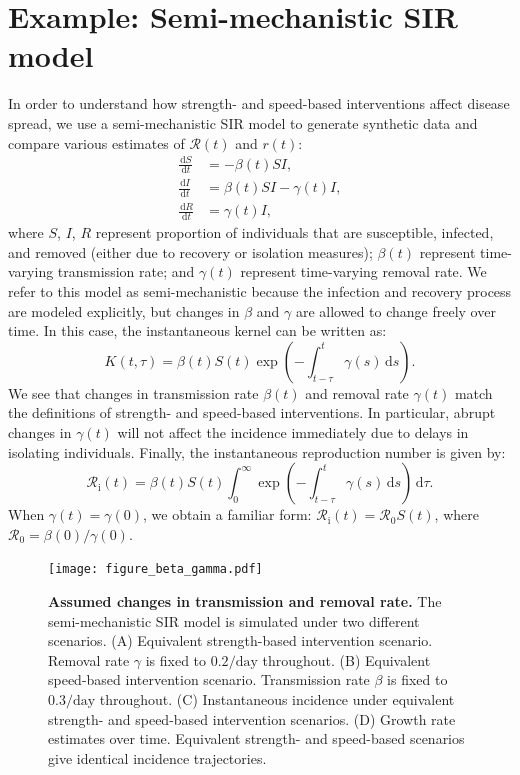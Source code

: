 \documentclass[12pt]{article}
\newcommand{\pday}{\ensuremath{/\textrm{day}}}
\newcommand{\Rx}[1]{\ensuremath{{\mathcal R}_{#1}}\xspace}
\newcommand{\Ro}{\Rx{0}}
\newcommand{\Ri}{\Rx{\mathrm{i}}}
\newcommand{\RR}{\ensuremath{{\mathcal R}}\xspace}
\newcommand{\dd}[1]{\ensuremath{\, \mathrm{d}#1}}
\newcommand{\dtau}{\dd{\tau}}
\begin{document}
\section{Example: Semi-mechanistic SIR model}

In order to understand how strength- and speed-based interventions affect disease spread, we use a semi-mechanistic SIR model to generate synthetic data and compare various estimates of $\RR(t)$ and $r(t)$:
\begin{align}
\frac{\dd{S}}{\dd{t}} &= - \beta(t)S I, \label{eq:dSdt}\\
\frac{\dd{I}}{\dd{t}} &= \beta(t)S I - \gamma(t) I,\\
\frac{\dd{R}}{\dd{t}} &= \gamma(t) I,  \label{eq:dRdt}
\end{align}
where $S$, $I$, $R$ represent proportion of individuals that are susceptible, infected, and removed (either due to recovery or isolation measures);
$\beta(t)$ represent time-varying transmission rate; and $\gamma(t)$ represent time-varying removal rate.
We refer to this model as semi-mechanistic because the infection and recovery process are modeled explicitly, but changes in $\beta$ and $\gamma$ are allowed to change freely over time.
In this case, the instantaneous kernel can be written as:
\begin{equation}
K(t, \tau) = \beta(t) S(t) \exp\left(-\int_{t-\tau}^t \gamma(s) \dd{s} \right).
\end{equation}
We see that changes in transmission rate $\beta(t)$ and removal rate $\gamma(t)$ match the definitions of strength- and speed-based interventions.
In particular, abrupt changes in $\gamma(t)$ will not affect the incidence immediately due to delays in isolating individuals.
Finally, the instantaneous reproduction number is given by:
\begin{equation}
\Ri(t) = \beta(t) S(t) \int_0^\infty \exp\left(-\int_{t-\tau}^t \gamma(s) \dd{s} \right) \dtau.
\end{equation}
When $\gamma(t) = \gamma(0)$, we obtain a familiar form: $\Ri(t) = \Ro S(t)$,
where $\Ro = \beta(0)/\gamma(0)$.

\begin{figure}[!ht]
\texttt{[image: figure\_beta\_gamma.pdf]}
\caption{
\textbf{Assumed changes in transmission and removal rate.}
The semi-mechanistic SIR model is simulated under two different scenarios.
(A) Equivalent strength-based intervention scenario.
Removal rate $\gamma$ is fixed to $0.2\pday$ throughout.
(B) Equivalent speed-based intervention scenario.
Transmission rate $\beta$ is fixed to $0.3\pday$ throughout.
(C) Instantaneous incidence under equivalent strength- and speed-based intervention scenarios.
(D) Growth rate estimates over time.
Equivalent strength- and speed-based scenarios give identical incidence trajectories.
}
\label{fig:assumption}
\end{figure}
\end{document}

